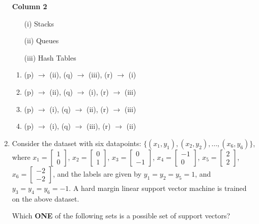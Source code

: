 \documentclass[journal,12pt,onecolumn]{IEEEtran}
\theoremstyle{remark}
\begin{document}
\begin{enumerate}
\begin{multicols}{2}
\columnbreak

\textbf{Column 2}
\begin{enumerate}
    \item[(i)] Stacks
    \item[(ii)] Queues
    \item[(iii)] Hash Tables
\end{enumerate}
\end{multicols}

\begin{enumerate}
    \item (p) $ \rightarrow $ (ii), (q) $ \rightarrow $ (iii), (r) $ \rightarrow $ (i)
    \item (p) $ \rightarrow $ (ii), (q) $ \rightarrow $ (i), (r) $ \rightarrow $ (iii)
    \item (p) $ \rightarrow $ (i), (q) $ \rightarrow $ (ii), (r) $ \rightarrow $ (iii)
    \item (p) $ \rightarrow $ (i), (q) $ \rightarrow $ (iii), (r) $ \rightarrow $ (ii)
\end{enumerate}

\item Consider the dataset with six datapoints: $ \{ (x_1, y_1), (x_2, y_2), \dots, (x_6, y_6) \} $,
where $ x_1 = \begin{bmatrix} 1 \\ 0 \end{bmatrix} $, $ x_2 = \begin{bmatrix} 0 \\ 1 \end{bmatrix} $, $ x_3 = \begin{bmatrix} 0 \\ -1 \end{bmatrix} $, $ x_4 = \begin{bmatrix} -1 \\ 0 \end{bmatrix} $, $ x_5 = \begin{bmatrix} 2 \\ 2 \end{bmatrix} $, $ x_6 = \begin{bmatrix} -2 \\ -2 \end{bmatrix} $,
and the labels are given by $ y_1 = y_2 = y_5 = 1 $, and $ y_3 = y_4 = y_6 = -1 $. A hard margin linear support vector machine is trained on the above dataset.

Which \textbf{ONE} of the following sets is a possible set of support vectors?


\end{enumerate}
\end{document}

